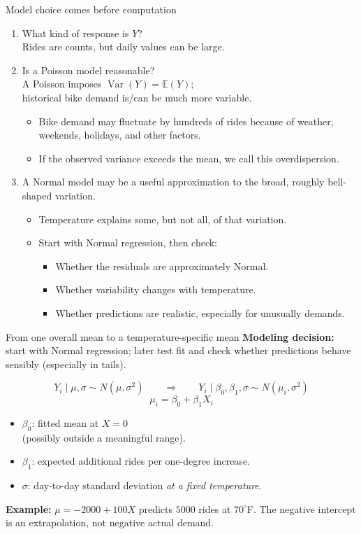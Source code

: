 \documentclass[aspectratio=43,11pt]{beamer}
\newcommand{\E}{\mathbb{E}}
\begin{document}
\begin{frame}{Model choice comes before computation}
\small
\begin{enumerate}
\item What kind of response is $Y$?\\ \footnotesize{Rides are counts, but daily values can be large.}
\item Is a Poisson model reasonable?\\\footnotesize{A Poisson imposes $\operatorname{Var}(Y)=\E(Y)$;\\historical bike demand is/can be much more variable.}
\begin{itemize}
\item \footnotesize{Bike demand may fluctuate by hundreds of rides because of weather, weekends, holidays, and other factors.}
\item \footnotesize{If the observed variance exceeds the mean, we call this overdispersion.}
\end{itemize}
\item A Normal model may be a useful approximation to the broad, roughly bell-shaped variation.
\begin{itemize}
\item \footnotesize{Temperature explains some, but not all, of that variation.}
\item \footnotesize{Start with Normal regression, then check:}
\begin{itemize}
\item \footnotesize{Whether the residuals are approximately Normal.}
\item \footnotesize{Whether variability changes with temperature.}
\item \footnotesize{Whether predictions are realistic, especially for unusually demands.}
\end{itemize}
\end{itemize}
\end{enumerate}
\end{frame}

\begin{frame}{From one overall mean to a temperature-specific mean}
\textbf{Modeling decision:} start with Normal regression; later test fit and check whether predictions behave sensibly (especially in tails).

\[Y_i\mid\mu,\sigma\sim N(\mu,\sigma^2)\qquad\Longrightarrow\qquad
Y_i\mid\beta_0,\beta_1,\sigma\sim N(\mu_i,\sigma^2)\]
\[\boxed{\mu_i=\beta_0+\beta_1 X_i}\]

\begin{itemize}
\item $\beta_0$: fitted mean at $X=0$\\ \footnotesize{(possibly outside a meaningful range).}
\item $\beta_1$: expected additional rides per one-degree increase.
\item $\sigma$: day-to-day standard deviation \emph{at a fixed temperature}.
\end{itemize}
\par\medskip
\textbf{Example:} $\mu=-2000+100X$ predicts $5000$ rides at $70^\circ$F.
The negative intercept is an extrapolation, not negative actual demand.
\end{frame}
\end{document}

